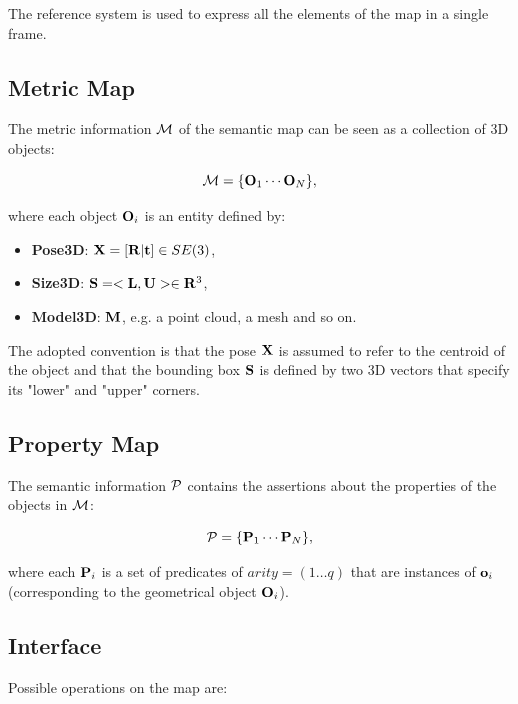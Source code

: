 \documentclass{article}
\begin{document}
	The reference system is used to express all the elements of the map in a single frame.
	
	\subsection{Metric Map}	
		
	The metric information $\mathcal{M}$ of the semantic map can be seen as a collection of 3D objects:
	
	\begin{equation}
		\mathcal{M} = \{\mathbf{O}_1 \cdots \mathbf{O}_N\},
	\end{equation}
	
	\noindent	
	where each object $\mathbf{O}_i$ is an entity defined by:
	
	\begin{itemize}
		\item {\bf Pose3D}: $\mathbf{X} = [ \mathbf{R} | \mathbf{t}] \in SE(3)$,
		\item {\bf Size3D}: $\mathbf{S} = <\mathbf{L} ,\mathbf{U}> \in \mathbf{R}^3 $,
		\item {\bf Model3D}: $\mathbf{M}$, e.g. a point cloud, a mesh and so on.
	\end{itemize}
	
	The adopted convention is that the pose $\mathbf{X}$ is assumed to refer to the centroid of the object and that the bounding box $\mathbf{S}$ is defined by two 3D vectors that specify its "lower" and "upper" corners.
	
	\subsection{Property Map}	
		
	The semantic information $\mathcal{P}$ contains the assertions about the properties of the objects in $\mathcal{M}$:
	
	\begin{equation}
	\mathcal{P} = \{\mathbf{P}_1 \cdots \mathbf{P}_N\},
	\end{equation}
	
	\noindent
	where each $\mathbf{P}_i$ is a set of predicates of $arity = (1 \dots q)$ that are instances of $\mathbf{o}_i$ (corresponding to the geometrical object $\mathbf{O}_i$).
	
	\subsection{Interface}
	
	Possible operations on the map are:
	
\end{document}

